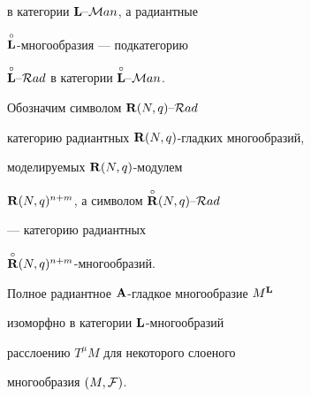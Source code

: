 в категории ${{\bold L}}\text{--}{\cal M}an$, а радиантные


$\overset{\circ}{\bold L}{}$-многообразия --- подкатегорию


$\overset{\circ}{\bold L}{}\text{--}{\cal R}ad$ в категории $\overset{\circ}{\bold L}{}\text{--}{\cal M}an$.


Обозначим символом ${{\bold R}}(N,q)\text{--}{\cal R}ad$


категорию радиантных ${\bold R}(N,q)$-гладких многообразий,


моделируемых ${\bold R}(N,q)$-модулем


${\bold R}(N,q)^{n+m}$, а символом $\overset{\circ}{{\bold R}}{}(N,q)\text{--}{\cal R}ad$


--- категорию радиантных


$\overset{\circ}{{\bold R}}{}(N,q)^{n+m}$-мно\-го\-об\-ра\-зий.





\begin{thmnonum}\label{t1}


Полное радиантное ${\bold A}$-гладкое многообразие $M^{\bold L}$ 


изоморфно в категории ${\bold L}$-мно\-го\-об\-ра\-зий


расслоению $T^\mu M$ для некоторого слоеного


многообразия $(M,{\cal F})$.


\end{thmnonum}





